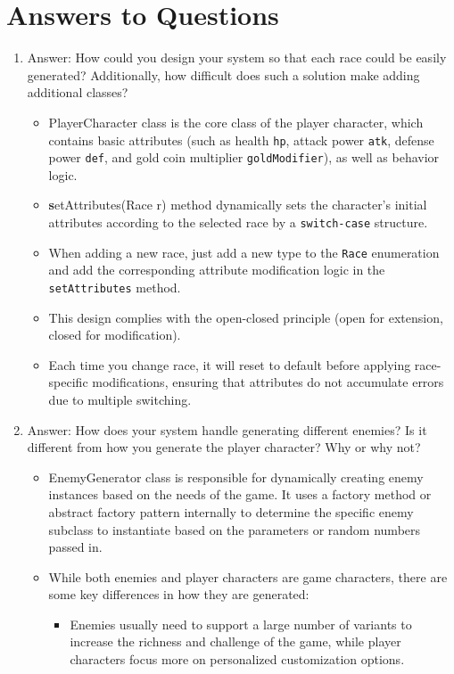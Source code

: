 \documentclass{article}
\begin{document}
\section{Answers to Questions}
\begin{enumerate}
    \item 
    Answer: How could you design your system so that each race could be easily generated? Additionally, how difficult does such a solution make adding additional classes?
        \begin{itemize}
            \item PlayerCharacter class is the core class of the player character, which contains basic attributes (such as health \texttt{hp}, attack power \texttt{atk}, defense power \texttt{def}, and gold coin multiplier \texttt{goldModifier}), as well as behavior logic.
            \item \textbf setAttributes(Race r) method dynamically sets the character's initial attributes according to the selected race by a \texttt{switch-case} structure.
            \item When adding a new race, just add a new type to the \texttt{Race} enumeration and add the corresponding attribute modification logic in the \texttt{setAttributes} method.
            \item This design complies with the open-closed principle (open for extension, closed for modification).
            \item Each time you change race, it will reset to default before applying race-specific modifications, ensuring that attributes do not accumulate errors due to multiple switching.
        \end{itemize}
    \item Answer: How does your system handle generating different enemies? Is it different from how you generate the player character? Why or why not?
        \begin{itemize}
            \item EnemyGenerator class is responsible for dynamically creating enemy instances based on the needs of the game. It uses a factory method or abstract factory pattern internally to determine the specific enemy subclass to instantiate based on the parameters or random numbers passed in.
            \item While both enemies and player characters are game characters, there are some key differences in how they are generated:
            \begin{itemize}
                \item Enemies usually need to support a large number of variants to increase the richness and challenge of the game, while player characters focus more on personalized customization options.

\end{itemize}
\end{itemize}
\end{enumerate}
\end{document}
